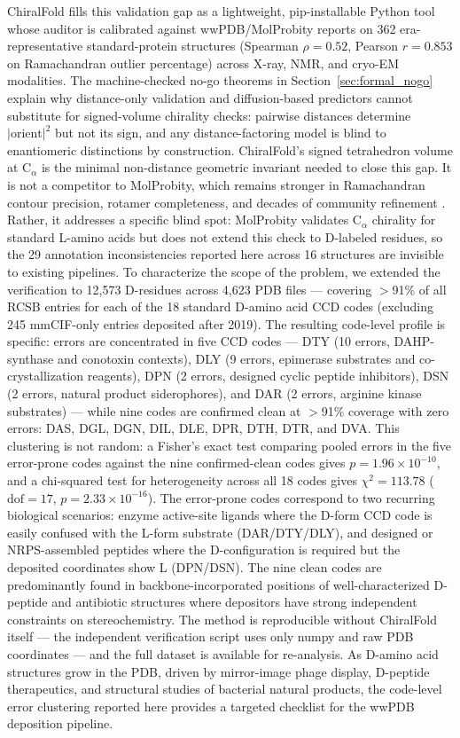 \documentclass[11pt]{article}
\begin{document}
ChiralFold fills this validation gap as a lightweight, pip-installable Python tool whose auditor is calibrated against wwPDB/MolProbity reports on 362 era-representative standard-protein structures (Spearman $\rho=0.52$, Pearson $r=0.853$ on Ramachandran outlier percentage) across X-ray, NMR, and cryo-EM modalities. The machine-checked no-go theorems in Section~\ref{sec:formal_nogo} explain why distance-only validation and diffusion-based predictors cannot substitute for signed-volume chirality checks: pairwise distances determine $|\mathrm{orient}|^2$ but not its sign, and any distance-factoring model is blind to enantiomeric distinctions by construction. ChiralFold's signed tetrahedron volume at C$_\alpha$ is the minimal non-distance geometric invariant needed to close this gap. It is not a competitor to MolProbity, which remains stronger in Ramachandran contour precision, rotamer completeness, and decades of community refinement \citep{chen2010,lovell2003}. Rather, it addresses a specific blind spot: MolProbity validates C$_\alpha$ chirality for standard L-amino acids but does not extend this check to D-labeled residues, so the 29 annotation inconsistencies reported here across 16 structures are invisible to existing pipelines. To characterize the scope of the problem, we extended the verification to 12,573 D-residues across 4,623 PDB files --- covering $>$91\% of all RCSB entries for each of the 18 standard D-amino acid CCD codes (excluding 245 mmCIF-only entries deposited after 2019). The resulting code-level profile is specific: errors are concentrated in five CCD codes --- DTY (10 errors, DAHP-synthase and conotoxin contexts), DLY (9 errors, epimerase substrates and co-crystallization reagents), DPN (2 errors, designed cyclic peptide inhibitors), DSN (2 errors, natural product siderophores), and DAR (2 errors, arginine kinase substrates) --- while nine codes are confirmed clean at $>$91\% coverage with zero errors: DAS, DGL, DGN, DIL, DLE, DPR, DTH, DTR, and DVA. This clustering is not random: a Fisher's exact test comparing pooled errors in the five error-prone codes against the nine confirmed-clean codes gives $p=1.96\times10^{-10}$, and a chi-squared test for heterogeneity across all 18 codes gives $\chi^2=113.78$ ($\mathrm{dof}=17$, $p=2.33\times10^{-16}$). The error-prone codes correspond to two recurring biological scenarios: enzyme active-site ligands where the D-form CCD code is easily confused with the L-form substrate (DAR/DTY/DLY), and designed or NRPS-assembled peptides where the D-configuration is required but the deposited coordinates show L (DPN/DSN). The nine clean codes are predominantly found in backbone-incorporated positions of well-characterized D-peptide and antibiotic structures where depositors have strong independent constraints on stereochemistry. The method is reproducible without ChiralFold itself --- the independent verification script uses only numpy and raw PDB coordinates --- and the full dataset is available for re-analysis. As D-amino acid structures grow in the PDB, driven by mirror-image phage display, D-peptide therapeutics, and structural studies of bacterial natural products, the code-level error clustering reported here provides a targeted checklist for the wwPDB deposition pipeline.
\end{document}
